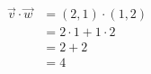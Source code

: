 \documentclass[preview]{standalone}
\begin{document}
\begin{align*}
\vec{v} \cdot \vec{w} &= (2, 1) \cdot (1, 2)\\ &= 2 \cdot 1 + 1 \cdot 2\\ &= 2 + 2\\ &= 4
\end{align*}
\end{document}
